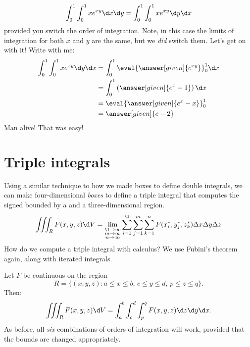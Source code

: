 \documentclass{ximera}
\begin{document}
\begin{example}
\begin{explanation}
    \[
    \int_0^1 \int_0^1 x e^{xy} \d x \d y =  \int_0^1 \int_0^1 x e^{xy} \d y \d x
    \]
    provided you switch the order of integration. Note, in this case
    the limits of integration for both $x$ and $y$ are the same, but
    we \textit{did} switch them. Let's get on with it! Write with me:
    \begin{align*}
      \int_0^1 \int_0^1 x e^{xy} \d y \d x &= \int_0^1 \eval{\answer[given]{e^{xy}}}_0^1\d x\\
      &= \int_0^1 \left(\answer[given]{e^x - 1}\right) \d x \\
      &= \eval{\answer[given]{e^x - x}}_0^1\\
      &= \answer[given]{e-2}
    \end{align*}
    Man alive! That was easy!
  \end{explanation}
\end{example}



\section{Triple integrals}

Using a similar technique to how we made boxes to define double
integrals, we can make four-dimensional \textit{boxes} to define a
triple integral that computes the signed
bounded by a
and a three-dimensional region.
\[
\iiint_R F(x,y,z) \d V = \lim_{\substack{\l\to\infty\\ m\to\infty\\ n\to\infty}}\sum_{i=1}^\l\sum_{j=1}^m \sum_{k=1}^n F(x^*_i,y^*_j,z_k^*)\Delta x\Delta y\Delta z
\]
How do we compute a triple integral with calculus? We use Fubini's theorem again, along with iterated integrals.

\begin{theorem}
  Let $F$ be continuous on the region
  \[
  R = \{(x,y,z):\text{$a\le x\le b$, $c\le y\le d$, $p\le z\le q$}\}.
  \]
  Then:
  \[
  \iiint_R F(x,y,z) \d V  = \int_a^b\int_c^d\int_p^q F(x,y,z)\d z \d y\d x.
  \]
  As before, all \textit{six} combinations of orders of integration
  will work, provided that the bounds are changed appropriately. 
\end{theorem}
\end{document}
